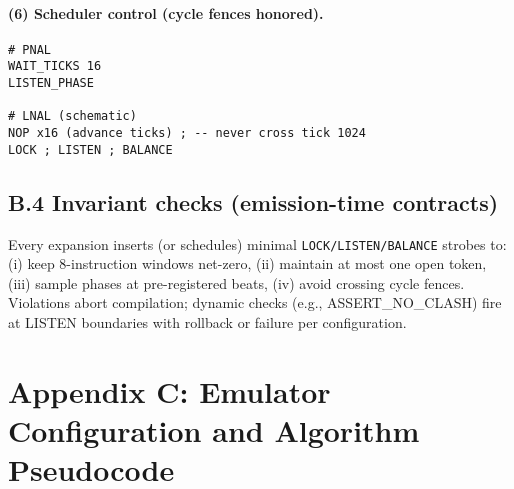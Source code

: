 \documentclass[12pt,a4paper]{article}
\begin{document}
\paragraph{(6) Scheduler control (cycle fences honored).}
\begin{verbatim}
# PNAL
WAIT_TICKS 16
LISTEN_PHASE

# LNAL (schematic)
NOP x16 (advance ticks) ; -- never cross tick 1024
LOCK ; LISTEN ; BALANCE
\end{verbatim}

\subsection*{B.4 Invariant checks (emission-time contracts)}
Every expansion inserts (or schedules) minimal \texttt{LOCK/LISTEN/BALANCE} strobes to:
(i) keep 8-instruction windows net-zero,
(ii) maintain at most one open token,
(iii) sample phases at pre-registered beats,
(iv) avoid crossing cycle fences.
Violations abort compilation; dynamic checks (e.g., ASSERT\_NO\_CLASH) fire at LISTEN boundaries with rollback or failure per configuration.

\section*{Appendix C: Emulator Configuration and Algorithm Pseudocode}
\end{document}
